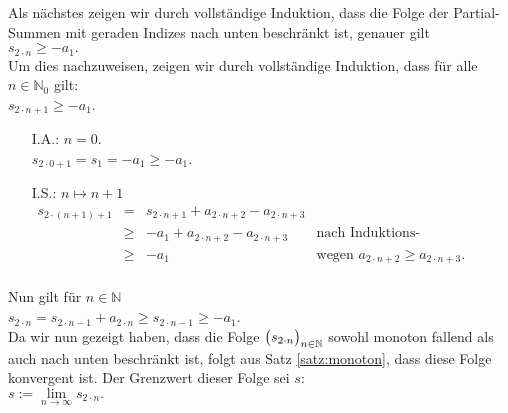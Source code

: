 Als n\"achstes zeigen wir durch vollst\"andige Induktion, dass die Folge der Partial-Summen
mit geraden Indizes nach unten beschr\"ankt ist, genauer gilt
\\[0.2cm]
\hspace*{1.3cm}
$  s_{2\cdot n} \geq - a_1. $
\\[0.2cm]
Um dies nachzuweisen, zeigen wir durch vollst\"andige Induktion, dass f\"ur alle
$n\in\mathbb{N}_0$ gilt:
      \\[0.2cm]
      \hspace*{1.3cm}      
      $s_{2\cdot n+1} \geq - a_1$.
\begin{enumerate}
\item[I.A.:] $n=0$.
      \\[0.2cm]
      \hspace*{1.3cm} $s_{2\cdot 0+1} = s_1 = -a_1 \geq -a_1$.
\item[I.S.:] $n \mapsto n+1$ 
             \\[0.2cm]
\hspace*{1.3cm}
$ 
             \begin{array}{lcll}
               s_{2\cdot(n+1)+1} & = &  s_{2\cdot n+1} + a_{2\cdot n+2} - a_{2\cdot n+3}      \\[0.2cm]
                            & \geq & - a_1 + a_{2\cdot n+2} - a_{2\cdot n+3} & \mbox{nach Induktions-Voraussetzung}   \\[0.2cm]
                            & \geq & - a_1 & \mbox{wegen $a_{2\cdot n+2} \geq a_{2\cdot n+3}$.} \\[0.2cm]
                          
             \end{array}
             $
\\[0.2cm]
\end{enumerate}
Nun gilt f\"ur $n \in \mathbb{N}$
      \\[0.2cm]
      \hspace*{1.3cm}      
      $s_{2 \cdot n} = s_{2 \cdot n-1} + a_{2 \cdot n} \geq s_{2 \cdot n-1} \geq - a_1$.
      \\[0.2cm]
Da wir nun gezeigt haben, dass die Folge $\folge{s_{2 \cdot n}}$ sowohl monoton fallend als auch
nach unten beschr\"ankt ist, folgt aus Satz \ref{satz:monoton}, dass diese Folge konvergent ist.
Der Grenzwert dieser Folge sei $s$:
\\[0.2cm]
\hspace*{1.3cm}
$ s := \lim\limits_{n\rightarrow\infty} s_{2 \cdot n}. $
\\[0.2cm]
